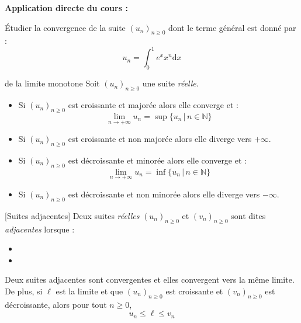 \documentclass[french,11pt,twoside]{VcCours}
\newenvironment{ApplicationDirecte}{\textbf{Application directe du cours :}

}{}
\newcommand{\dx}{\text{d}x}
\begin{document}
\newpage
\begin{ApplicationDirecte} Étudier la convergence de la suite $(u_n)_{n \geq 0}$ dont le terme général est donné par :
$$ u_n = \int_0^1 e^x x^n \dx$$
\end{ApplicationDirecte}

\begin{Theoreme}{de la limite monotone} Soit $(u_n)_{n \geq 0}$ une suite \emph{réelle}.


\begin{itemize}
\item Si $(u_n)_{n \geq 0}$ est croissante et majorée alors elle converge et :
$$\lim_{n \rightarrow + \infty} u_n = \sup \lbrace u_n \, \vert \, n \in \mathbb{N} \rbrace $$
\item Si $(u_n)_{n \geq 0}$ est croissante et non majorée alors elle diverge vers $+ \infty$.
\item Si $(u_n)_{n \geq 0}$ est décroissante et minorée alors elle converge et :
$$\lim_{n \rightarrow + \infty} u_n = \inf \lbrace u_n \, \vert \, n \in \mathbb{N} \rbrace $$
\item Si $(u_n)_{n \geq 0}$ est décroissante et non minorée alors elle diverge vers $- \infty$.
\end{itemize}
\end{Theoreme}

\begin{Definition}{}[Suites adjacentes]
Deux suites \emph{réelles} $(u_n)_{n \geq 0}$ et $(v_n)_{n \geq 0}$ sont dites \emph{adjacentes} lorsque :
\begin{itemize}
\item
\item 
\end{itemize}
\end{Definition}

\begin{Theoreme}{}
Deux suites adjacentes sont convergentes et elles convergent vers la même limite. De plus, si $\ell$ est la limite et que $(u_n)_{n \geq 0}$ est croissante et $(v_n)_{n \geq 0}$ est décroissante, alors pour tout $n \geq 0$,
$$ u_n \leq \ell \leq v_n $$
\end{Theoreme}
\end{document}
